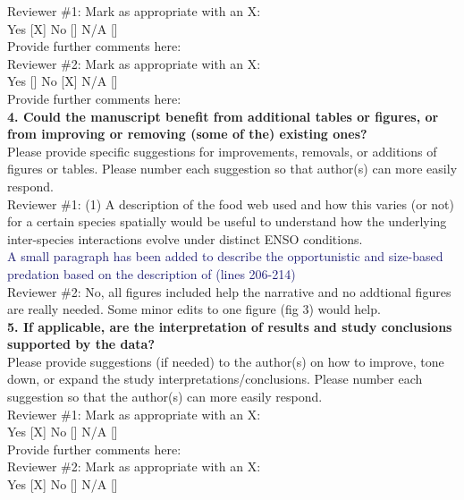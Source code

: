 \documentclass[12pt]{article}
\newcommand{\resp}[1]{\textcolor{MidnightBlue}{#1}}
\begin{document}
Reviewer \#1: Mark as appropriate with an X:\\
Yes [X] No [] N/A []\\
Provide further comments here:\\

Reviewer \#2: Mark as appropriate with an X:\\
Yes [] No [X] N/A []\\
Provide further comments here:\\

\textbf{4. Could the manuscript benefit from additional tables or figures, or from improving or removing (some of the) existing ones?} \\

Please provide specific suggestions for improvements, removals, or additions of figures or tables. Please number each suggestion so that author(s) can more easily respond.\\

Reviewer \#1: (1) A description of the food web used and how this varies (or not) for a certain species spatially would be useful to understand how the underlying inter-species interactions evolve under distinct ENSO conditions.\\

\resp{A small paragraph has been added to describe the opportunistic and size-based predation based on the
description of \cite{mauryIndividualsPopulationsCommunities2013} (lines 206-214)} \\


Reviewer \#2: No, all figures included help the narrative and no addtional figures are really needed. Some minor edits to one figure (fig 3) would help.\\

\textbf{5. If applicable, are the interpretation of results and study conclusions supported by the data?}\\

Please provide suggestions (if needed) to the author(s) on how to improve, tone down, or expand the study interpretations/conclusions. Please number each suggestion so that the author(s) can more easily respond.\\

Reviewer \#1: Mark as appropriate with an X:\\
Yes [X] No [] N/A []\\
Provide further comments here:\\

Reviewer \#2: Mark as appropriate with an X:\\
Yes [X] No [] N/A []\\
\end{document}
